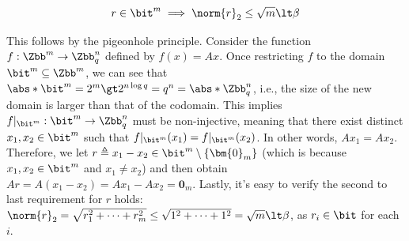 \begin{answer}[i]
    \leavevmode\par
    \begin{idea}
        \[
            r\in\bit^m \implies \norm{r}_2\le \sqrt{m}\lt \beta
        \] 
    \end{idea}
    This follows by the pigeonhole principle. Consider the function $f: \Zbb^m\to \Zbb_q^n$ defined by $f(x)=Ax$. Once restricting $f$ to the domain $\bit^m \subseteq \Zbb^m$, we can see that $\abs*{\bit^m}=2^m\gt 2^{n\log q}=q^n=\abs*{\Zbb_q^n}$, i.e., the size of the new domain is larger than that of the codomain. This implies $f|_{\bit^m}: \bit^m\to \Zbb_q^n$ must be non-injective, meaning that there exist distinct $x_1, x_2\in\bit^m$ such that  $f|_{\bit^m}(x_1)=f|_{\bit^m}(x_2)$. In other words, $Ax_1=Ax_2$. Therefore, we let $r\triangleq x_1-x_2 \in \bit^m\setminus \{\bm{0}_m\}$ (which is because $x_1, x_2\in\bit^m$ and $x_1\neq x_2$) and then obtain $Ar=A(x_1-x_2)=Ax_1-Ax_2=\bm{0}_m$. Lastly, it's easy to verify the second to last requirement for $r$ holds: $\norm{r}_2=\sqrt{r_1^2+\cdots+r_m^2}\le \sqrt{1^2+\cdots+1^2}=\sqrt{m}\lt \beta$, as $r_i\in\bit$ for each $i$.
\end{answer}



